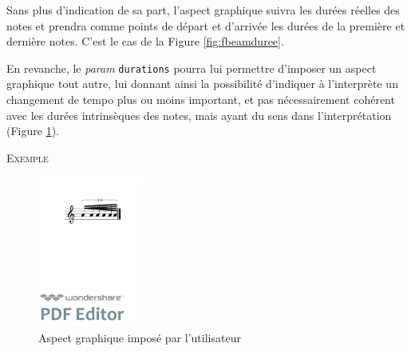 \documentclass{article}
\newenvironment{gmncode}	{\vspace{-2mm}\small\verbatim}{\endverbatim\vspace{-2mm}}
\newcommand{\code}[1]		{{\small \texttt{#1}}}
\newcommand{\exemple}		{\vspace{2mm}\hspace*{-6mm}\textsc{Exemple}}
\begin{document}
Sans plus d'indication de sa part, l'aspect graphique suivra les durées réelles des notes et prendra comme points de départ et d'arrivée les durées de la première et dernière notes.  C'est le cas de la Figure \ref{fig:fbeamduree}.

En revanche, le \emph{param} \code{durations} pourra lui permettre d'imposer un aspect graphique tout autre, lui donnant ainsi la possibilité d'indiquer à l'interprète un changement de tempo plus ou moins important, et pas nécessairement cohérent avec les durées intrinsèques des notes, mais ayant du sens dans l'interprétation (Figure \ref{fig:utilisateur}).

\exemple
\begin{figure}[h]
\centering
\begin{gmncode}
[ 
  \fBeam<durations="1/16,1/64", 
      drawDuration="true">
   (a/8 a/16 a a a/32 a) 
]
\end{gmncode}

\includegraphics[width=35mm]{img/durations.pdf}
\caption{Aspect graphique imposé par l'utilisateur}
\label{fig:utilisateur}
\end{figure}
\end{document}
